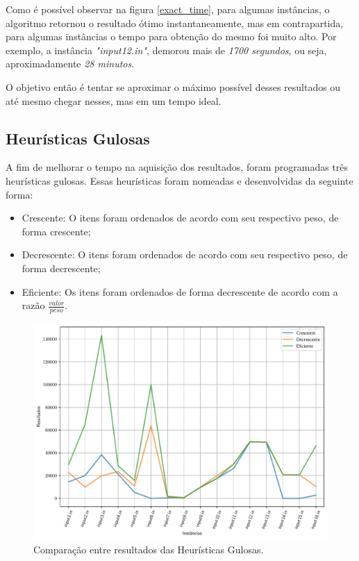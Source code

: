\documentclass[a4paper, 12pt]{article}
\begin{document}
Como é possível observar na figura \ref{exact_time}, para algumas instâncias, o algoritmo retornou
o resultado ótimo instantaneamente, mas em contrapartida, para algumas instâncias o
tempo para obtenção do mesmo foi muito alto. Por exemplo, a instância \textit{"input12.in"},
demorou mais de \textit{1700 segundos}, ou seja, aproximadamente \textit{28 minutos}.

O objetivo então é tentar se aproximar o máximo possível desses resultados ou até mesmo chegar nesses,
mas em um tempo ideal.

\subsection{Heurísticas Gulosas}
A fim de melhorar o tempo na aquisição dos resultados, foram programadas três heurísticas gulosas.
Essas heurísticas foram nomeadas e desenvolvidas da seguinte forma:
\begin{itemize}
    \item \footnotesize{Crescente: O itens foram ordenados de acordo com seu respectivo peso, de forma crescente;} 
    \item \footnotesize{Decrescente: O itens foram ordenados de acordo com seu respectivo peso, de forma decrescente;}
    \item \footnotesize{Eficiente: Os itens foram ordenados de forma decrescente de acordo com a razão $\frac{valor}{peso}$.}
\end{itemize}

\begin{figure}[!htb]
    \centering
    \includegraphics[width=0.7\linewidth]{../imgs/greedy_compare.pdf}
    \caption{Comparação entre resultados das Heurísticas Gulosas.}
    \label{greedy_compare}
\end{figure}
\end{document}
